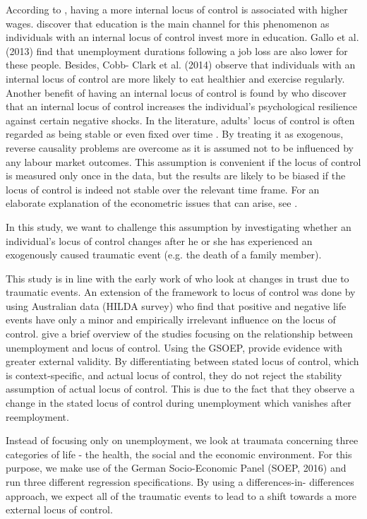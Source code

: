 \documentclass[12pt, a4paper, fleqn, parskip]{scrartcl}
\begin{document}
According to \citet{heineck2010}, having a more internal locus of control is
associated with higher wages. \citet{piatek2010} discover that education is the
main channel for this phenomenon as individuals with an internal locus of
control invest more in education. Gallo et al. (2013) find that unemployment
durations following a job loss are also lower for these people. Besides, Cobb-
Clark et al. (2014) observe that individuals with an internal locus of control
are more likely to eat healthier and exercise regularly. Another benefit of
having an internal locus of control is found by \citet{buddelmeyer2016} who
discover that an internal locus of control increases the individual's
psychological resilience against certain negative shocks. In the literature,
adults' locus of control is often regarded as being stable or even fixed over
time \citep{heineck2010,semykina2007}. By treating it as exogenous, reverse
causality problems are overcome as it is assumed not to be influenced by any
labour market outcomes. This assumption is convenient if the locus of control
is measured only once in the data, but the results are likely to be biased if
the locus of control is indeed not stable over the relevant time frame. For an
elaborate explanation of the econometric issues that can arise, see
\citet{cobb2013}.

In this study, we want to challenge this assumption by investigating whether an
individual's locus of control changes after he or she has experienced an
exogenously caused traumatic event (e.g. the death of a family member).

This study is in line with the early work of \citet{alesina2002} who look at
changes in trust due to traumatic events. An extension of the framework to
locus of control was done by \citet{cobb2013} using Australian data
(HILDA survey) who find that positive and negative life events have only a
minor and empirically irrelevant  influence on the locus of control.
\citet{preuss2017} give a brief overview of the studies focusing on the
relationship between unemployment and locus of control. Using the GSOEP,
\citet{preuss2017} provide evidence with greater external validity. By
differentiating between stated locus of control, which is context-specific, and
actual locus of control, they do not reject the stability assumption of actual
locus of control. This is due to the fact that they observe a change in the
stated locus of control during unemployment which vanishes after reemployment.

Instead of focusing only on unemployment, we look at traumata concerning three
categories of life - the health, the social and the economic environment.  For
this purpose, we make use of the German Socio-Economic Panel (SOEP, 2016) and
run three different regression specifications. By using a differences-in-
differences approach, we expect all of the traumatic events to lead to a shift
towards a more external locus of control.
\end{document}
